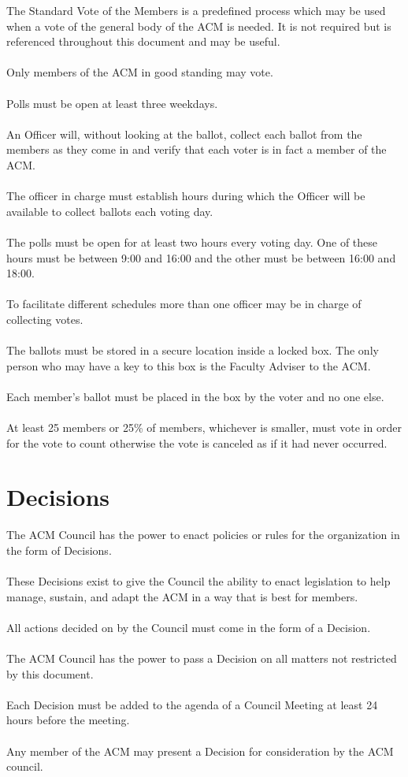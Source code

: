 \documentclass[12pt,titlepage]{article}
\begin{document}
The Standard Vote of the Members is a predefined process which may be used when a vote of the general body of the ACM is needed. It is not required but is referenced throughout this document and may be useful.\\
\\
Only members of the ACM in good standing may vote.\\
\\
Polls must be open at least three weekdays.\\
\\
An Officer will, without looking at the ballot, collect each ballot from the members as they come in and verify that each voter is in fact a member of the ACM.\\
\\
The officer in charge must establish hours during which the Officer will be available to collect ballots each voting day.\\
\\
The polls must be open for at least two hours every voting day. One of these hours must be between 9:00 and 16:00 and the other must be between 16:00 and 18:00.\\
\\
To facilitate different schedules more than one officer may be in charge of collecting votes.\\
\\
The ballots must be stored in a secure location inside a locked box. The only person who may have a key to this box is the Faculty Adviser to the ACM.\\
\\
Each member's ballot must be placed in the box by the voter and no one else.\\
\\
At least 25 members or 25\% of members, whichever is smaller, must vote in order for the vote to count otherwise the vote is canceled as if it had never occurred.

\section{Decisions}

The ACM Council has the power to enact policies or rules for the organization in the form of Decisions.\\
\\
These Decisions exist to give the Council the ability to enact legislation to help manage, sustain, and adapt the ACM in a way that is best for members.\\
\\
All actions decided on by the Council must come in the form of a Decision.\\
\\
The ACM Council has the power to pass a Decision on all matters not restricted by this document.\\
\\
Each Decision must be added to the agenda of a Council Meeting at least 24 hours before the meeting.\\
\\
Any member of the ACM may present a Decision for consideration by the ACM council.
\end{document}
